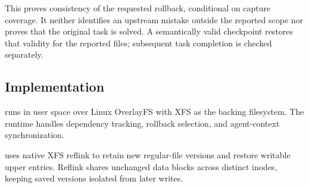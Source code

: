 This proves consistency of the requested rollback, conditional on capture
coverage. It neither identifies an upstream mistake outside the reported
scope nor proves that the original task is solved. A semantically valid
checkpoint restores that validity for the reported files; subsequent task
completion is checked separately.

\subsection{Implementation}
\label{sec:implementation}
\system runs in user space over Linux OverlayFS with XFS as the backing
filesystem. The runtime handles dependency tracking, rollback selection,
and agent-context synchronization.

\system uses native XFS reflink to retain new regular-file versions and
restore writable upper entries. Reflink shares unchanged data blocks
across distinct inodes, keeping saved versions isolated from later writes.
